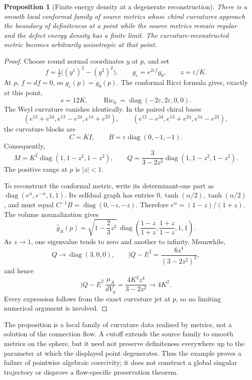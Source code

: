 \documentclass[11pt]{article}
\numberwithin{equation}{section}
\newtheorem{proposition}[theorem]{Proposition}
\theoremstyle{definition}
\theoremstyle{remark}
\begin{document}
\begin{proposition}[Finite energy density at a degenerate reconstruction]\label{prop:boundary-example}
There is a smooth local conformal family of source metrics whose chiral curvatures approach the boundary of definiteness at a point while the source metrics remain regular and the defect energy density has a finite limit. The curvature-reconstructed metric becomes arbitrarily anisotropic at that point.
\end{proposition}
\begin{proof}
Choose round normal coordinates \(y\) at \(p\), and set
\[
f=\tfrac12\bigl((y^1)^2-(y^2)^2\bigr),\qquad
g_\varepsilon=e^{2\varepsilon f}g_0,\qquad z=\varepsilon/K.
\]
At \(p\), \(f=df=0\), so \(g_\varepsilon(p)=g_0(p)\). The conformal Ricci formula gives, exactly at this point,
\[
s=12K,\qquad
\operatorname{Ric}_0=\operatorname{diag}(-2\varepsilon,2\varepsilon,0,0).
\]
The Weyl curvature vanishes identically. In the paired chiral bases
\[
(e^{12}+e^{34},e^{13}-e^{24},e^{14}+e^{23}),\qquad
(e^{12}-e^{34},e^{13}+e^{24},e^{14}-e^{23}),
\]
the curvature blocks are
\[
C=KI,\qquad B=\varepsilon\operatorname{diag}(0,-1,-1).
\]
Consequently,
\[
M=K^2\operatorname{diag}(1,1-z^2,1-z^2),\qquad
Q=\frac{3}{3-2z^2}\operatorname{diag}(1,1-z^2,1-z^2).
\]
The positive range at \(p\) is \(|z|<1\).

To reconstruct the conformal metric, write its determinant-one part as
\(\operatorname{diag}(e^\alpha,e^{-\alpha},1,1)\). Its selfdual graph has entries
\(0,\tanh(\alpha/2),\tanh(\alpha/2)\), and must equal
\(C^{-1}B=\operatorname{diag}(0,-z,-z)\). Therefore
\(e^\alpha=(1-z)/(1+z)\). The volume normalization gives
\begin{equation}\label{eq:degenerate-metric}
\widehat g_A(p)=
\sqrt{1-\frac23z^2}\,
\operatorname{diag}\left(
\frac{1-z}{1+z},\frac{1+z}{1-z},1,1
\right).
\end{equation}
As \(z\to1\), one eigenvalue tends to zero and another to infinity. Meanwhile,
\[
Q\longrightarrow\operatorname{diag}(3,0,0),\qquad
|Q-I|^2=\frac{6z^4}{(3-2z^2)^2},
\]
and hence
\begin{equation}\label{eq:bounded-density}
|Q-I|^2\,\frac{\mu_A}{dV_g}
=\frac{4K^2z^4}{3-2z^2}\longrightarrow4K^2.
\end{equation}
Every expression follows from the exact curvature jet at \(p\), so no limiting numerical argument is involved.
\end{proof}

The proposition is a local family of curvature data realized by metrics, not a solution of the connection flow. A cutoff extends the source family to smooth metrics on the sphere, but it need not preserve definiteness everywhere up to the parameter at which the displayed point degenerates. Thus the example proves a failure of pointwise algebraic coercivity; it does not construct a global singular trajectory or disprove a flow-specific preservation theorem.
\end{document}
